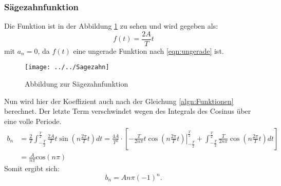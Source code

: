 \subsubsection{Sägezahnfunktion}
Die Funktion ist in der Abbildung \ref{fig:sagezahn} zu sehen und wird gegeben als:
\begin{equation*}
f(t) = \frac{2A}{T}t
\end{equation*}
mit $a_{n} = 0 $, da $f(t)$ eine ungerade Funktion nach \ref{eqn:ungerade} ist.
\begin{figure}[htb]
	\centering
	\texttt{[image: ../../Sagezahn]}
	\caption{Abbildung zur Sägezahnfunktion}
	\label{fig:sagezahn}
\end{figure}
Nun wird hier der Koeffizient auch nach der Gleichung \ref{algn:Funktionen} berechnet. Der letzte Term verschwindet wegen des Integrals des Cosinus über eine volle Periode.
\begin{align*}
b_{n} &= \frac{2}{T} \int_{-\frac{T}{2}}^{\frac{T}{2}} \frac{2A}{T}t\sin\left(n\frac{2\pi}{T}t\right)dt = \frac{4A}{T^2}\cdot\left[-\frac{T}{2n\pi}t \left.\cos\left(n\frac{2\pi}{T}t\right)\right|_{-\frac{T}{2}}^\frac{T}{2} + {\int_{-\frac{T}{2}}^{\frac{T}{2}} \frac{T}{2n\pi}\cos\left(n\frac{2\pi}{T}t\right)dt}\right] \\
&= \frac{A}{n\pi}\text{cos}(n\pi)
\end{align*}
Somit ergibt sich:
\begin{equation}
b_{n} = A{n\pi}(-1)^{n}.
\end{equation}
